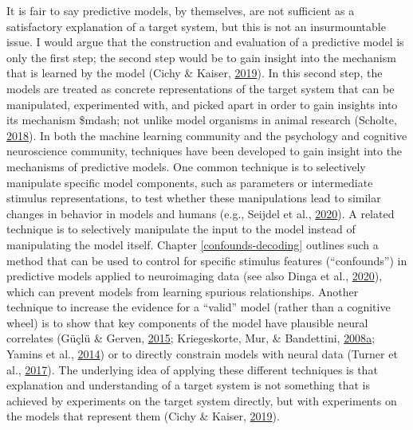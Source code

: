 \documentclass[11pt,american,]{memoir} %
\begin{document}
It is fair to say predictive models, by themselves, are not sufficient as a satisfactory explanation of a target system, but this is not an insurmountable issue. I would argue that the construction and evaluation of a predictive model is only the first step; the second step would be to gain insight into the mechanism that is learned by the model (Cichy \& Kaiser, \protect\hyperlink{ref-Cichy2019-zf}{2019}). In this second step, the models are treated as concrete representations of the target system that can be manipulated, experimented with, and picked apart in order to gain insights into its mechanism \$mdash; not unlike model organisms in animal research (Scholte, \protect\hyperlink{ref-Scholte2018-he}{2018}). In both the machine learning community and the psychology and cognitive neuroscience community, techniques have been developed to gain insight into the mechanisms of predictive models. One common technique is to selectively manipulate specific model components, such as parameters or intermediate stimulus representations, to test whether these manipulations lead to similar changes in behavior in models and humans (e.g., Seijdel et al., \protect\hyperlink{ref-Seijdel2020-ff}{2020}). A related technique is to selectively manipulate the input to the model instead of manipulating the model itself. Chapter \ref{confounds-decoding} outlines such a method that can be used to control for specific stimulus features (``confounds'') in predictive models applied to neuroimaging data (see also Dinga et al., \protect\hyperlink{ref-Dinga2020-si}{2020}), which can prevent models from learning spurious relationships. Another technique to increase the evidence for a ``valid'' model (rather than a cognitive wheel) is to show that key components of the model have plausible neural correlates (Güçlü \& Gerven, \protect\hyperlink{ref-Guclu2015-qj}{2015}; Kriegeskorte, Mur, \& Bandettini, \protect\hyperlink{ref-Kriegeskorte2008-kv}{2008}\protect\hyperlink{ref-Kriegeskorte2008-kv}{a}; Yamins et al., \protect\hyperlink{ref-yamins2014performance}{2014}) or to directly constrain models with neural data (Turner et al., \protect\hyperlink{ref-Turner2017-fi}{2017}). The underlying idea of applying these different techniques is that explanation and understanding of a target system is not something that is achieved by experiments on the target system directly, but with experiments on the models that represent them (Cichy \& Kaiser, \protect\hyperlink{ref-Cichy2019-zf}{2019}).
\end{document}
